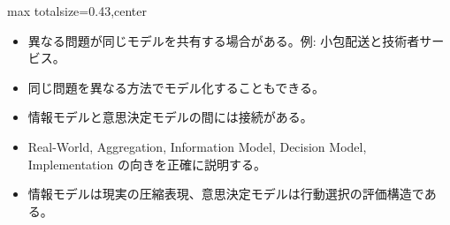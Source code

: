 \clearpage
{}
\begin{minipage}[t]{0.405\textwidth}
\begin{adjustbox}{max totalsize={\textwidth}{0.43\textheight},center}
\begin{minipage}{\textwidth}\scriptsize
{}\begin{itemize}
\item 異なる問題が同じモデルを共有する場合がある。例: 小包配送と技術者サービス。
\item 同じ問題を異なる方法でモデル化することもできる。
\item 情報モデルと意思決定モデルの間には接続がある。
\end{itemize}\begin{itemize}
\item Real-World, Aggregation, Information Model, Decision Model, Implementation の向きを正確に説明する。
\item 情報モデルは現実の圧縮表現、意思決定モデルは行動選択の評価構造である。
\end{itemize}
\end{minipage}
\end{adjustbox}
\end{minipage}\hfill

